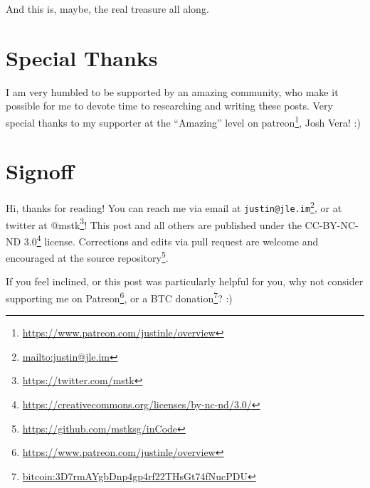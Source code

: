 \documentclass[]{article}
\renewcommand{\href}[2]{#2\footnote{\url{#1}}}
\begin{document}
And this is, maybe, the real treasure all along.

\section{Special Thanks}\label{special-thanks}

I am very humbled to be supported by an amazing community, who make it possible
for me to devote time to researching and writing these posts. Very special
thanks to my supporter at the ``Amazing'' level on
\href{https://www.patreon.com/justinle/overview}{patreon}, Josh Vera! :)

\section{Signoff}\label{signoff}

Hi, thanks for reading! You can reach me via email at
\href{mailto:justin@jle.im}{\nolinkurl{justin@jle.im}}, or at twitter at
\href{https://twitter.com/mstk}{@mstk}! This post and all others are published
under the \href{https://creativecommons.org/licenses/by-nc-nd/3.0/}{CC-BY-NC-ND
3.0} license. Corrections and edits via pull request are welcome and encouraged
at \href{https://github.com/mstksg/inCode}{the source repository}.

If you feel inclined, or this post was particularly helpful for you, why not
consider \href{https://www.patreon.com/justinle/overview}{supporting me on
Patreon}, or a \href{bitcoin:3D7rmAYgbDnp4gp4rf22THsGt74fNucPDU}{BTC donation}?
:)
\end{document}
